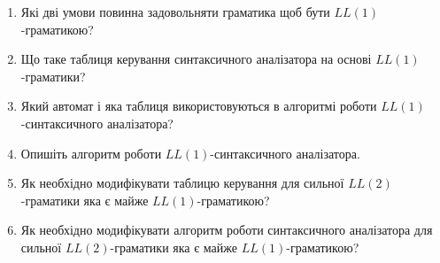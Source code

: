 \begin{enumerate}
	\item Які дві умови повинна задовольняти граматика щоб бути $LL(1)$-гра\-ма\-ти\-кою?
	\item Що таке таблиця керування синтаксичного аналізатора на основі $LL(1)$-гра\-ма\-ти\-ки?
	\item Який автомат і яка таблиця використовуються в алгоритмі роботи $LL(1)$-син\-так\-сич\-но\-го аналізатора? %
	\item Опишіть алгоритм роботи $LL(1)$-синтаксичного аналізатора.
	\item Як необхідно модифікувати таблицю керування для сильної $LL(2)$-гра\-ма\-ти\-ки яка є майже $LL(1)$-гра\-ма\-ти\-кою?
	\item Як необхідно модифікувати алгоритм роботи синтаксичного аналізатора для сильної $LL(2)$-гра\-ма\-ти\-ки яка є майже $LL(1)$-гра\-ма\-ти\-кою?
\end{enumerate}
